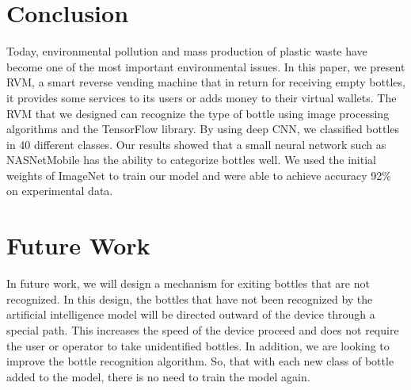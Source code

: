 \documentclass[conference]{IEEEtran}
\begin{document}
\section{Conclusion}
Today, environmental pollution and mass production of plastic waste have become one of the most important environmental issues. In this paper, we present RVM, a smart reverse vending machine that in return for receiving empty bottles, it provides some services to its users or adds money to their virtual wallets. The RVM that we designed can recognize the type of bottle using image processing algorithms and the TensorFlow library. By using deep CNN, we classified bottles in 40 different classes. Our results showed that a small neural network such as NASNetMobile has the ability to categorize bottles well. We used the initial weights of ImageNet to train our model and were able to achieve accuracy 92\% on experimental data.

\section{Future Work}
In future work, we will design a mechanism for exiting bottles that are not recognized. In this design, the bottles that have not been recognized by the artificial intelligence model will be directed outward of the device through a special path. This increases the speed of the device proceed and does not require the user or operator to take unidentified bottles. In addition, we are looking to improve the bottle recognition algorithm. So, that with each new class of bottle added to the model, there is no need to train the model again.\par




\end{document}
